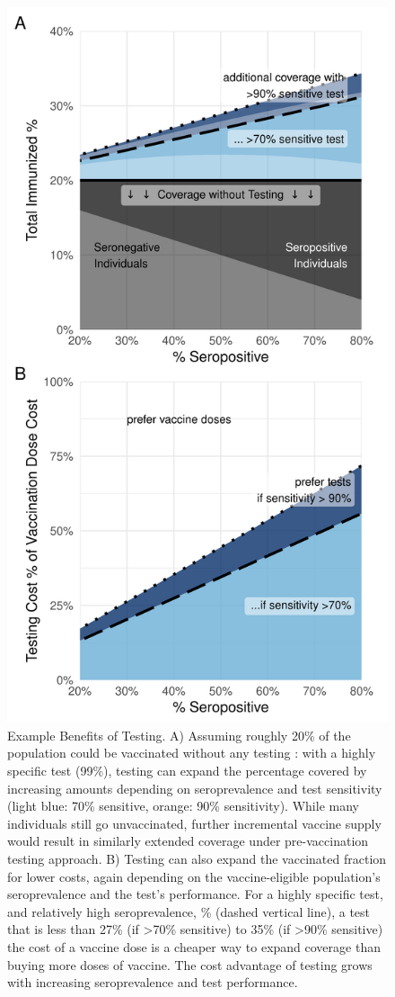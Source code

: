 \documentclass[10pt,a4paper,twocolumn]{article}
\begin{document}
\begin{figure}
\centering
\includegraphics[width=\linewidth]{main.png}
\caption{\label{mainfig}Example Benefits of Testing. A) Assuming roughly 20\% of the population could be vaccinated without any testing \cite{noauthor_gavi_nodate}: with a highly specific test (99\%), testing can expand the percentage covered by increasing amounts depending on seroprevalence and test sensitivity (light blue: 70\% sensitive, orange: 90\% sensitivity). While many individuals still go unvaccinated, further incremental vaccine supply would result in similarly extended coverage under pre-vaccination testing approach. B) Testing can also expand the vaccinated fraction for lower costs, again depending on the vaccine-eligible population's seroprevalence and the test's performance. For a highly specific test, and relatively high seroprevalence, \% (dashed vertical line), a test that is less than 27\% (if >70\% sensitive) to 35\% (if >90\% sensitive) the cost of a vaccine dose is a cheaper way to expand coverage than buying more doses of vaccine. The cost advantage of testing grows with increasing seroprevalence and test performance.}

\end{figure}
\end{document}
